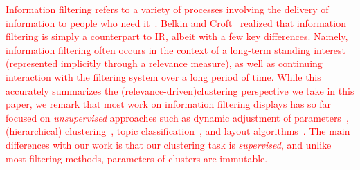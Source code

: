 




\textcolor{red}{ Information filtering refers to a variety of processes involving the delivery of information to people who need it~\cite{Hanani2001}. 
Belkin and Croft~\cite{Belkin1992} realized that information filtering is simply a counterpart to IR, albeit with a few key differences.  Namely,  
information filtering often occurs in the context of a long-term standing interest (represented implicitly through a relevance measure), as well as continuing interaction with the filtering system over a long period of time.
While this accurately summarizes the (relevance-driven)clustering perspective we take in this paper, we remark that most work on information filtering  displays has so far focused on \emph{unsupervised} approaches such as 
dynamic adjustment of parameters~\cite{Ahlberg1995,Bennamane2012,Young1993},
(hierarchical) clustering~\cite{Nocaj2012,Teitler2008,Smith2009}, 
topic classification~\cite{Sankaranarayanan2009,Liu2012,Liu2009}, 
and layout algorithms~\cite{Yifan2015,Jacomy2014,Sugiyama1981,Kamada1989}. 
The main differences with our work is that our clustering task is \emph{supervised}, and unlike most filtering methods, parameters of clusters are immutable.}

